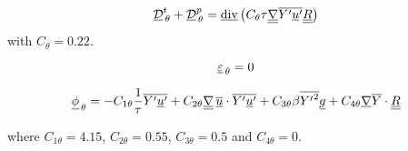 \begin{equation}
  \underline{\mathcal{D}}_{\,\theta}^{t} + \underline{\mathcal{D}}_{\,\theta}^{p} = \underline{\text{div}}\,{\left(C_{\theta} \tau  \underline{\underline{{\nabla}}}{{\overline{{{Y}^\prime} {{\underline{u}}^\prime}}}}\underline{\underline{R}} \right)}
\end{equation}
with $C_\theta=0.22$.

\begin{equation}
  \underline{\varepsilon}_{\,\theta}=0
\end{equation}

\begin{equation}
  \underline{\phi}_{\,\theta}= -C_{1 \theta} \frac{1}{\tau} {\overline{{{Y}^\prime}{{\underline{u}}^\prime}}} + C_{2 \theta} \underline{\underline{{\nabla}}}{\,{\overline{\underline{u}}}}\cdot {\overline{{{Y}^\prime}{{\underline{u}}^\prime}}}  + C_{3 \theta} \beta {\overline{{{Y}^\prime}^2}}\underline{g}  + C_{4 \theta} \underline{\nabla}{{\overline{Y}}}\cdot \underline{\underline{R}}
\label{eq:phi_lineaire}
\end{equation}

where $C_{1 \theta}=4.15$, $C_{2 \theta}=0.55$, $C_{3 \theta}=0.5$ and $C_{4 \theta}=0$.


